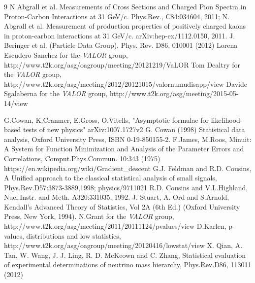 \begin{thebibliography}{9}
  N Abgrall et al. Measurements of Cross Sections and Charged Pion Spectra in Proton-Carbon Interactions
  at 31 GeV/c. Phys.Rev., C84:034604, 2011;
  N. Abgrall et al. Measurement of production properties of positively charged kaons in proton-carbon
  interactions at 31 GeV/c. arXiv:hep-ex/1112.0150, 2011.
%
%
  J. Beringer et al. (Particle Data Group), Phys. Rev. D86, 010001 (2012)
%
%
  Lorena Escudero Sanchez for the {\em VALOR} group, 
  http://www.t2k.org/asg/oagroup/meeting/20121219/VaLOR%
  Tom Dealtry for the {\em VALOR} group,
  http://www.t2k.org/asg/meeting/2012/20121015/valornumudisapp/view
  Davide Sgalaberna for the {\em VALOR} group,
  http://www.t2k.org/asg/meeting/2015-05-14/view

%
%
G.Cowan, K.Cranmer, E.Gross, O.Vitells,
"Asymptotic formulae for likelihood-based tests of new physics"
arXiv:1007.1727v2
  G. Cowan (1998) Statistical data analysis, 
  Oxford University Press, ISBN 0-19-850155-2.
  F.James, M.Roos, Minuit: A System for Function Minimization and Analysis of the 
  Parameter Errors and Correlations, Comput.Phys.Commun. 10:343 (1975)
https://en.wikipedia.org/wiki/Gradient\_descent
  G.J. Feldman and R.D. Cousins,
  A Unified approach to the classical statistical analysis of small signals,
  Phys.Rev.D57:3873-3889,1998; physics/9711021
  R.D. Cousins and V.L.Highland, 
  Nucl.Instr. and Meth. A320:331035, 1992.
J. Stuart, A. Ord and S.Arnold,
Kendall's Advanced Theory of Statistics, Vol 2A (6th Ed.) 
(Oxford University Press, New York, 1994).
 N.Grant for the {\em VALOR} group,
 http://www.t2k.org/asg/meeting/2011/20111124/pvalues/view
 D.Karlen,
 p-values, distributions and low statistics,
 http://www.t2k.org/asg/oagroup/meeting/20120416/lowstat/view
 X. Qian, A. Tan, W. Wang, J. J. Ling, R. D. McKeown and C. Zhang,
 Statistical evaluation of experimental determinations of neutrino mass hierarchy,
 Phys.Rev.D86, 113011 (2012)
 

\end{thebibliography}
